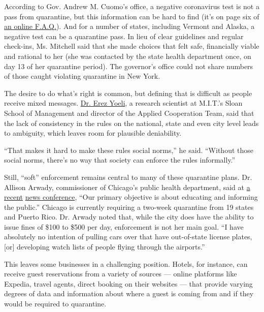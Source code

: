 According to Gov. Andrew M. Cuomo's office, a negative coronavirus test
is not a pass from quarantine, but this information can be hard to find
(it's on page six of
\href{https://coronavirus.health.ny.gov/system/files/documents/2020/07/nys-covid-travel-advisory-faq_0.pdf}{an
online F.A.Q.}). And for a number of states, including Vermont and
Alaska, a negative test can be a quarantine pass. In lieu of clear
guidelines and regular check-ins, Ms. Mitchell said that she made
choices that felt safe, financially viable and rational to her (she was
contacted by the state health department once, on day 13 of her
quarantine period). The governor's office could not share numbers of
those caught violating quarantine in New York.

The desire to do what's right is common, but defining that is difficult
as people receive mixed messages. \href{http://erezyoeli.com/}{Dr. Erez
Yoeli}, a research scientist at M.I.T.'s Sloan School of Management and
director of the Applied Cooperation Team, said that the lack of
consistency in the rules on the national, state and even city level
leads to ambiguity, which leaves room for plausible deniability.

``That makes it hard to make these rules social norms,'' he said.
``Without those social norms, there's no way that society can enforce
the rules informally.''

Still, ``soft'' enforcement remains central to many of these quarantine
plans. Dr. Allison Arwady, commissioner of Chicago's public health
department, said at
\href{https://www.facebookcorewwwi.onion/ChicagoMayorsOffice/videos/292903845473289}{a
recent}
\href{https://www.facebookcorewwwi.onion/ChicagoMayorsOffice/videos/292903845473289}{news
conference}, ``Our primary objective is about educating and informing
the public.'' Chicago is currently requiring a two-week quarantine from
19 states and Puerto Rico. Dr. Arwady noted that, while the city does
have the ability to issue fines of \$100 to \$500 per day, enforcement
is not her main goal. ``I have absolutely no intention of pulling cars
over that have out-of-state license plates, {[}or{]} developing watch
lists of people flying through the airports.''

This leaves some businesses in a challenging position. Hotels, for
instance, can receive guest reservations from a variety of sources ---
online platforms like Expedia, travel agents, direct booking on their
websites --- that provide varying degrees of data and information about
where a guest is coming from and if they would be required to
quarantine.

